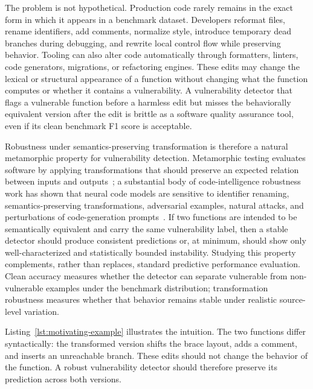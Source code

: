 \documentclass[a4paper,fleqn]{cas-dc}
\begin{document}
The problem is not hypothetical. Production code rarely remains in the exact
form in which it appears in a benchmark dataset. Developers reformat files,
rename identifiers, add comments, normalize style, introduce temporary dead
branches during debugging, and rewrite local control flow while preserving
behavior. Tooling can also alter code automatically through formatters,
linters, code generators, migrations, or refactoring engines. These edits may
change the lexical or structural appearance of a function without changing what
the function computes or whether it contains a vulnerability. A vulnerability
detector that flags a vulnerable function before a harmless edit but misses the
behaviorally equivalent version after the edit is brittle as a software quality
assurance tool, even if its clean benchmark F1 score is acceptable.

Robustness under semantics-preserving transformation is therefore a natural
metamorphic property for vulnerability detection. Metamorphic testing evaluates
software by applying transformations that should preserve an expected relation
between inputs and outputs~\cite{chen2018metamorphic}; a substantial body of
code-intelligence robustness work has shown that neural code models are
sensitive to identifier renaming, semantics-preserving transformations,
adversarial examples, natural attacks, and perturbations of code-generation
prompts~\cite{yefet2020adversarial,zhang2020mhm,bielik2020adversarial,
rabin2021generalizability,henkel2022semantic,yang2022alert,zhang2022carrot,
wang2023recode,li2025robustness}. If two functions are
intended to be semantically equivalent and carry the same vulnerability label,
then a stable detector should produce consistent predictions or, at minimum,
should show only well-characterized and statistically bounded instability.
Studying this property complements, rather than replaces, standard predictive
performance evaluation. Clean accuracy measures whether the detector can
separate vulnerable from non-vulnerable examples under the benchmark
distribution; transformation robustness measures whether that behavior remains
stable under realistic source-level variation.

Listing~\ref{lst:motivating-example} illustrates the intuition. The two
functions differ syntactically: the transformed version shifts the brace layout,
adds a comment, and inserts an unreachable branch. These edits should not
change the behavior of the function. A robust vulnerability detector should
therefore preserve its prediction across both versions.
\end{document}
